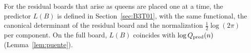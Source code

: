 For the residual boards that arise as queens are placed one at a time, the predictor $L(B)$ is defined in
Section~\ref{sec:B3T01}, with the same functional, the canonical determinant of the residual board and the
normalization $\tfrac12\log(2\pi)$ per component. On the full board, $L(B)$ coincides with
$\log Q_{\rm pred}(n)$ (Lemma~\ref{lem:puente}).
